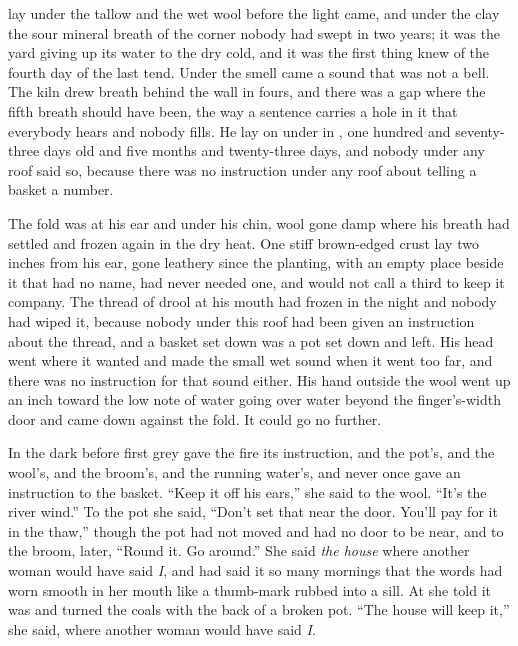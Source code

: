 
 lay under the tallow and the wet wool before the light came, and under the clay the sour mineral breath of the corner nobody had swept in two years; it was the yard giving up its water to the dry cold, and it was the first thing  knew of the fourth day of the last tend. Under the smell came a sound that was not a bell. The kiln drew breath behind the wall in fours, and there was a gap where the fifth breath should have been, the way a sentence carries a hole in it that everybody hears and nobody fills. He lay on  under  in , one hundred and seventy-three days old and five months and twenty-three days, and nobody under any roof said so, because there was no instruction under any roof about telling a basket a number.

The fold was at his ear and under his chin, wool gone damp where his breath had settled and frozen again in the dry heat. One stiff brown-edged crust lay two inches from his ear, gone leathery since the planting, with an empty place beside it that had no name, had never needed one, and would not call a third to keep it company. The thread of drool at his mouth had frozen in the night and nobody had wiped it, because nobody under this roof had been given an instruction about the thread, and a basket set down was a pot set down and left. His head went where it wanted and made the small wet sound when it went too far, and there was no instruction for that sound either. His hand outside the wool went up an inch toward the low note of water going over water beyond the finger's-width door and came down against the fold. It could go no further.

In the dark before first grey  gave the fire its instruction, and the pot's, and the wool's, and the broom's, and the running water's, and never once gave an instruction to the basket. “Keep it off his ears,” she said to the wool. “It's the river wind.” To the pot she said, “Don't set that near the door. You'll pay for it in the thaw,” though the pot had not moved and had no door to be near, and to the broom, later, “Round it. Go around.” She said \emph{the house} where another woman would have said \emph{I}, and had said it so many mornings that the words had worn smooth in her mouth like a thumb-mark rubbed into a sill. At  she told  it was  and turned the coals with the back of a broken pot. “The house will keep it,” she said, where another woman would have said \emph{I}.


